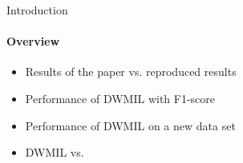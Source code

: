
\begin{frame}{Introduction}
\framesubtitle{Overview}

\begin{itemize}
    \item Results of the paper vs. reproduced results
    \item Performance of DWMIL with F1-score
    \item Performance of DWMIL on a new data set
    \item DWMIL vs. \lpn
\end{itemize}

\end{frame}

